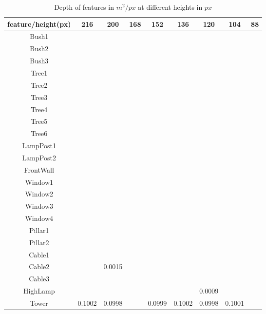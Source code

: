 \begin{table}[!htb]
\centering
    \begin{tabular}{| c | c | c | c | c | c | c | c | c |}
    \hline
    feature/height(px) & 216 & 200 & 168 & 152 & 136 & 120 & 104 & 88\\ \hline
		 Bush1 &  &  &  &  &  &  &  & \\ \hline
		 Bush2 &  &  &  &  &  &  &  & \\ \hline	
		 Bush3 &  &  &  &  &  &  &  & \\ \hline	
		 Tree1 &  &  &  &  &  &  &  & \\ \hline	
		 Tree2 &  &  &  &  &  &  &  & \\ \hline	
		 Tree3 &  &  &  &  &  &  &  & \\ \hline	
		 Tree4 &  &  &  &  &  &  &  & \\ \hline	
		 Tree5 &  &  &  &  &  &  &  & \\ \hline	
		 Tree6 &  &  &  &  &  &  &  & \\ \hline	
     LampPost1 &  &  &  &  &  &  &  & \\ \hline
		 LampPost2 &  &  &  &  &  &  &  & \\ \hline
		 FrontWall &  &  &  &  &  &  &  & \\ \hline
		 Window1 &  &  &  &  &  &  &  & \\ \hline
		 Window2 &  &  &  &  &  &  &  & \\ \hline
		 Window3 &  &  &  &  &  &  &  & \\ \hline
		 Window4 &  &  &  &  &  &  &  & \\ \hline
		 Pillar1 &  &  &  &  &  &  &  & \\ \hline
		 Pillar2 &  &  &  &  &  &  &  & \\ \hline
		 Cable1 &  &  &  &  &  &  &  & \\ \hline
	   Cable2 &  & 0.0015 &  &  &  &  &  & \\ \hline
	   Cable3 &  &  &  &  &  &  &  & \\ \hline
		 HighLamp &  &  &  &  &  & 0.0009 &  & \\ \hline
	   Tower & 0.1002 & 0.0998 &  & 0.0999 & 0.1002 & 0.0998 & 0.1001 & \\ \hline
    \end{tabular}
		\caption{Depth of features in $m^2/px$ at different heights in $px$}\label{table5}
\end{table}

